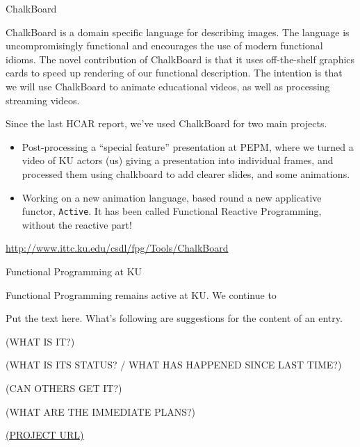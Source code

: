 \documentclass{scrreprt}
\begin{document}
\begin{hcarentry}{ChalkBoard}
\makeheader

ChalkBoard is a domain specific language for describing images. 
The language is uncompromisingly functional
and encourages the use of modern functional idioms.
The novel contribution of ChalkBoard is that it uses off-the-shelf
graphics cards to speed up rendering of our functional description.
The intention is that we will use ChalkBoard to animate educational
videos, as well as processing streaming videos.

Since the last HCAR report, we've used ChalkBoard for two main projects.
\begin{itemize}
\item Post-processing a ``special feature'' presentation at PEPM, where we turned
a video of KU actors (us) giving a presentation into individual frames,
and processed them using chalkboard to add clearer slides, and some animations.
\item Working on a new animation language, based round a new applicative
functor, \verb|Active|. It has been called Functional Reactive Programming,
without the reactive part!
\end{itemize}

\FurtherReading
  \url{http://www.ittc.ku.edu/csdl/fpg/Tools/ChalkBoard}
\end{hcarentry}

\begin{hcarentry}{Functional Programming at KU}
\makeheader

Functional Programming remains active at KU. We continue to 

Put the text here. What's following are suggestions for the content of an entry.

(WHAT IS IT?)

(WHAT IS ITS STATUS? / WHAT HAS HAPPENED SINCE LAST TIME?)

(CAN OTHERS GET IT?)

(WHAT ARE THE IMMEDIATE PLANS?)

\FurtherReading
  \url{(PROJECT URL)}
\end{hcarentry}
\end{document}
